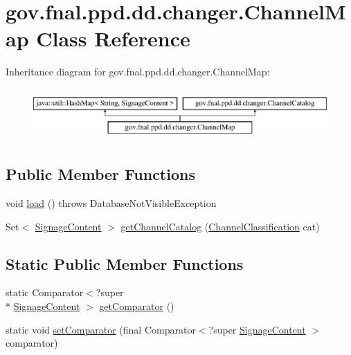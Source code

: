\hypertarget{classgov_1_1fnal_1_1ppd_1_1dd_1_1changer_1_1ChannelMap}{\section{gov.\-fnal.\-ppd.\-dd.\-changer.\-Channel\-Map Class Reference}
\label{classgov_1_1fnal_1_1ppd_1_1dd_1_1changer_1_1ChannelMap}
}
Inheritance diagram for gov.\-fnal.\-ppd.\-dd.\-changer.\-Channel\-Map\-:\begin{figure}[H]
\begin{center}
\leavevmode
\includegraphics[height=1.992882cm]{classgov_1_1fnal_1_1ppd_1_1dd_1_1changer_1_1ChannelMap}
\end{center}
\end{figure}
\subsection*{Public Member Functions}
\begin{DoxyCompactItemize}
\item 
void \hyperlink{classgov_1_1fnal_1_1ppd_1_1dd_1_1changer_1_1ChannelMap_a30c699e2eb86a310daa014e974c29bac}{load} ()  throws Database\-Not\-Visible\-Exception 
\item 
Set$<$ \hyperlink{interfacegov_1_1fnal_1_1ppd_1_1dd_1_1signage_1_1SignageContent}{Signage\-Content} $>$ \hyperlink{classgov_1_1fnal_1_1ppd_1_1dd_1_1changer_1_1ChannelMap_a34cad0dedd9b3ed3418a405d0c85ed27}{get\-Channel\-Catalog} (\hyperlink{classgov_1_1fnal_1_1ppd_1_1dd_1_1changer_1_1ChannelClassification}{Channel\-Classification} cat)
\end{DoxyCompactItemize}
\subsection*{Static Public Member Functions}
\begin{DoxyCompactItemize}
\item 
static Comparator$<$?super \\*
\hyperlink{interfacegov_1_1fnal_1_1ppd_1_1dd_1_1signage_1_1SignageContent}{Signage\-Content} $>$ \hyperlink{classgov_1_1fnal_1_1ppd_1_1dd_1_1changer_1_1ChannelMap_a84bd80c4a6675118fd137cc9258b7ebc}{get\-Comparator} ()
\item 
static void \hyperlink{classgov_1_1fnal_1_1ppd_1_1dd_1_1changer_1_1ChannelMap_a0b5890b5e7eaf8d8ffdb38bb6b4fae64}{set\-Comparator} (final Comparator$<$?super \hyperlink{interfacegov_1_1fnal_1_1ppd_1_1dd_1_1signage_1_1SignageContent}{Signage\-Content} $>$ comparator)
\end{DoxyCompactItemize}


